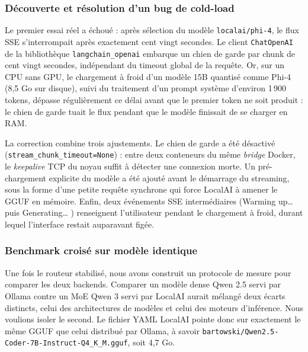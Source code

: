        \subsubsection{Découverte et résolution d'un bug de \og cold-load \fg{}}

        Le premier essai réel a échoué : après sélection du modèle
        \texttt{localai/\allowbreak{}phi-4}, le flux SSE s'interrompait après exactement
        cent vingt secondes. Le client \texttt{ChatOpenAI} de la bibliothèque
        \texttt{langchain\_\allowbreak{}openai} embarque un chien de garde par chunk de
        cent vingt secondes, indépendant du timeout global de la requête. Or, sur un
        CPU sans GPU, le chargement à froid d'un modèle 15B quantisé comme Phi-4
        (8,5 Go sur disque), suivi du traitement d'un prompt système d'environ
        1\,900 tokens, dépasse régulièrement ce délai avant que le premier token ne
        soit produit : le chien de garde tuait le flux pendant que le modèle
        finissait de se charger en RAM.

        La correction combine trois ajustements. Le chien de garde a été désactivé
        (\texttt{stream\_\allowbreak{}chunk\_\allowbreak{}timeout=None}) : entre deux conteneurs du même
        \textit{bridge} Docker, le \textit{keepalive} TCP du noyau suffit à détecter
        une connexion morte. Un pré-chargement explicite du modèle a été ajouté avant
        le démarrage du streaming, sous la forme d'une petite requête synchrone qui
        force LocalAI à amener le GGUF en mémoire. Enfin, deux événements SSE
        intermédiaires (\og Warming up\ldots{} \fg{} puis \og Generating\ldots{} \fg{})
        renseignent l'utilisateur pendant le chargement à froid, durant lequel
        l'interface restait auparavant figée.

        \subsubsection{Benchmark croisé sur modèle identique}

        Une fois le routeur stabilisé, nous avons construit un protocole de mesure
        pour comparer les deux backends. Comparer un modèle dense Qwen 2.5 servi par
        Ollama contre un MoE Qwen 3 servi par LocalAI aurait mélangé deux écarts
        distincts, celui des architectures de modèles et celui des moteurs
        d'inférence. Nous voulions isoler le second. Le fichier YAML LocalAI pointe
        donc sur exactement le même GGUF que celui distribué par Ollama, à savoir
        \texttt{bartowski/\allowbreak{}Qwen2.\allowbreak{}5-Coder-7B-Instruct-Q4\_\allowbreak{}K\_\allowbreak{}M.\allowbreak{}gguf}, soit 4,7 Go.

